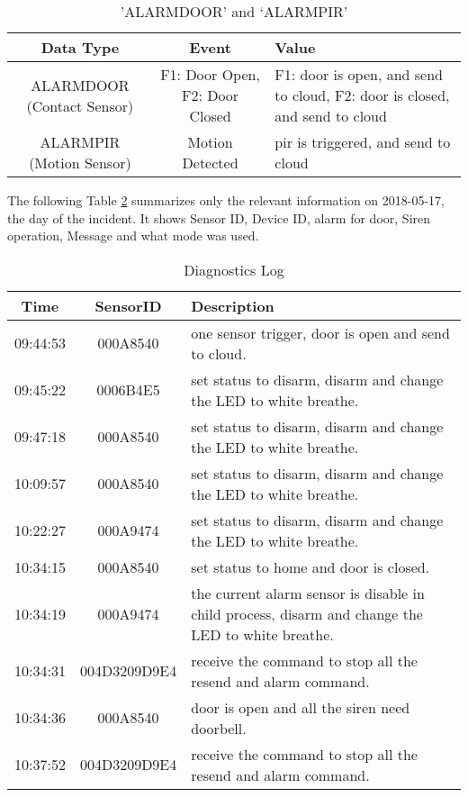 \documentclass{easychair}
\begin{document}
\begin{table}[h]
\begin{tabular}{|c|c| m{4cm}|}							 
\hline
Data Type	& Event & Value \\
\hline
ALARMDOOR (Contact Sensor) & F1: Door Open, 
F2: Door Closed
 & F1: door is open, and send to cloud, F2: door is closed, and send to cloud \\
\hline
ALARMPIR (Motion Sensor) & Motion Detected & pir is triggered, and send to cloud \\
\hline

\end{tabular}
 \caption{'ALARMDOOR’ and ‘ALARMPIR’}
   \label{tab:'ALARMDOOR’ and ‘ALARMPIR’ }
\end{table}

The following Table \ref{tab:Diagnostics Log} summarizes only the relevant information on 2018-05-17, the day of the incident. It shows Sensor ID, Device ID, alarm for door, Siren operation, Message and what mode was used.
\begin{table}[h]
\begin{tabular}{|c|c| m{10cm}|}							 
\hline
Time	& SensorID & Description \\
\hline
09:44:53 &000A8540 & one sensor trigger, door is open and send to cloud.
 \\
\hline
09:45:22 & 0006B4E5 & set status to disarm, disarm and change the LED to white breathe.
 \\
\hline
09:47:18 &000A8540  & set status to disarm, disarm and change the LED to white breathe.
 \\
\hline
10:09:57 &000A8540  & set status to disarm, disarm and change the LED to white breathe.
 \\
\hline
10:22:27 & 000A9474 & set status to disarm, disarm and change the LED to white breathe.
 \\
\hline
 10:34:15 &000A8540  & set status to home and door is closed.
 \\
\hline
10:34:19 & 000A9474 & the current alarm sensor is disable in child process, disarm and change the LED to white breathe.
 \\
\hline
10:34:31 & 004D3209D9E4 & receive the command to stop all the resend and alarm command.
 \\
\hline
10:34:36 & 000A8540 & door is open and all the siren need doorbell.
 \\
\hline
10:37:52 & 004D3209D9E4 & receive the command to stop all the resend and alarm command.

 \\
\hline

\end{tabular}
 \caption{Diagnostics Log}
   \label{tab:Diagnostics Log}
\end{table}
\end{document}
